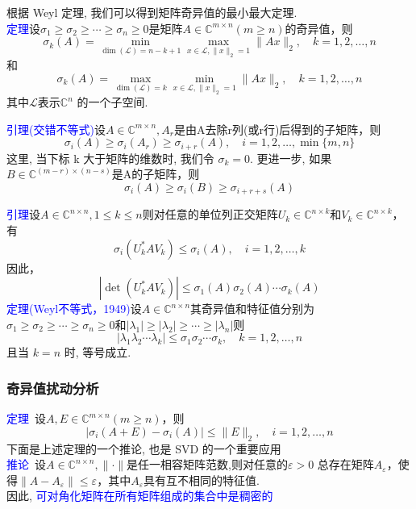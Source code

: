 \documentclass[notheorems,serif]{beamer}
\begin{document}
\begin{frame}
根据 Weyl 定理, 我们可以得到矩阵奇异值的最小最大定理.\\

\textcolor{blue}{定理}设$\sigma_{1} \geq \sigma_{2} \geq \cdots \geq \sigma_{n} \geq 0$是矩阵$A \in \mathbb{C}^{m \times n}(m \geq n)$的奇异值，则
$$
\sigma_{k}(A)=\min _{\operatorname{dim}(\mathcal{L})=n-k+1} \max _{x \in \mathcal{L},\|x\|_{2}=1}\|A x\|_{2}, \quad k=1,2, \ldots, n
$$
和
$$
\sigma_{k}(A)=\max _{\operatorname{dim}(\mathcal{L})=k} \min _{x \in \mathcal{L},\|x\|_{2}=1}\|A x\|_{2}, \quad k=1,2, \ldots, n
$$
其中$\mathcal{L}$表示$\mathbb{C}^{n}$ 的一个子空间.
\end{frame}

\begin{frame}
\textcolor{blue}{引理(交错不等式)}设$A \in \mathbb{C}^{m \times n}, A_{r}$是由A去除r列(或r行)后得到的子矩阵，则
$$
\sigma_{i}(A) \geq \sigma_{i}\left(A_{r}\right) \geq \sigma_{i+r}(A), \quad i=1,2, \ldots, \min \{m, n\}
$$
这里, 当下标 k 大于矩阵的维数时, 我们令 $\sigma_{k} = 0$.
更进一步, 如果$B \in \mathbb{C}^{(m-r) \times(n-s)}$是A的子矩阵，则
$$
\sigma_{i}(A) \geq \sigma_{i}(B) \geq \sigma_{i+r+s}(A)
$$
\end{frame}

\begin{frame}
\textcolor{blue}{引理}设$A \in \mathbb{C}^{n \times n}, 1 \leq k \leq n$则对任意的单位列正交矩阵$U_{k} \in \mathbb{C}^{n \times k}$和$V_{k} \in \mathbb{C}^{n \times k}$，有
\begin{equation}
\sigma_{i}\left(U_{k}^{*} A V_{k}\right) \leq \sigma_{i}(A), \quad i=1,2, \ldots, k
\end{equation}
因此，
\begin{equation}
\left|\operatorname{det}\left(U_{k}^{*} A V_{k}\right)\right| \leq \sigma_{1}(A) \sigma_{2}(A) \cdots \sigma_{k}(A)
\end{equation}
\textcolor{blue}{定理(Weyl不等式，1949)}设$A \in \mathbb{C}^{n \times n}$其奇异值和特征值分别为$\sigma_{1} \geq \sigma_{2} \geq \cdots \geq \sigma_{n} \geq 0$和$\left|\lambda_{1}\right| \geq\left|\lambda_{2}\right| \geq \cdots \geq\left|\lambda_{n}\right|$则
$$
\left|\lambda_{1} \lambda_{2} \cdots \lambda_{k}\right| \leq \sigma_{1} \sigma_{2} \cdots \sigma_{k}, \quad k=1,2, \ldots, n
$$
且当 $k = n$ 时, 等号成立.
\end{frame}

\begin{frame}
\frametitle{奇异值扰动分析}

\textcolor{blue}{定理}~设$A, E \in \mathbb{C}^{m \times n}(m \geq n)$，则
$$
\left|\sigma_{i}(A+E)-\sigma_{i}(A)\right| \leq\|E\|_{2}, \quad i=1,2, \ldots, n
$$
下面是上述定理的一个推论, 也是 SVD 的一个重要应用\\

\textcolor{blue}{推论}~设$A \in \mathbb{C}^{n \times n},\|\cdot\|$是任一相容矩阵范数,则对任意的$\varepsilon>0$
总存在矩阵$A_{\varepsilon}$，使得$\left\|A-A_{\varepsilon}\right\| \leq \varepsilon$，其中$A_{\varepsilon}$具有互不相同的特征值.\\
因此, \textcolor{blue}{可对角化矩阵在所有矩阵组成的集合中是稠密的}
\end{frame}
\end{document}
